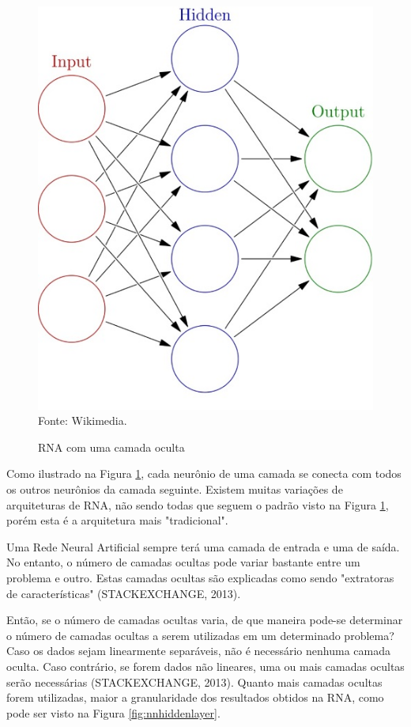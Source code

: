 \documentclass[12pt,a4paper]{article}
\newcommand{\source}[1]{\small Fonte: {#1}}
\begin{document}
	\begin{figure}[ht!]
		\caption{RNA com uma camada oculta}
		\centering
		\includegraphics[scale=0.5]{BasicNN.jpg}\\
		\vspace{0.5mm}
		\source{Wikimedia.}
		\label{fig:basicnn}
	\end{figure}
	
	Como ilustrado na Figura \ref{fig:basicnn},
	cada neurônio de uma camada se conecta com todos os outros neurônios da camada seguinte.
	Existem muitas variações de arquiteturas de RNA,
	não sendo todas que seguem o padrão visto na Figura \ref{fig:basicnn},
	porém esta é a arquitetura mais "tradicional"{}.
	
	Uma Rede Neural Artificial sempre terá uma camada de entrada e uma de saída.
	No entanto, o número de camadas ocultas pode variar bastante entre um problema e outro.
	Estas camadas ocultas são explicadas como sendo "extratoras de características"{}
	(STACKEXCHANGE, 2013).
	
	Então, se o número de camadas ocultas varia,
	de que maneira pode-se determinar o número de camadas ocultas a serem utilizadas em um determinado problema?
	Caso os dados sejam linearmente separáveis,
	não é necessário nenhuma camada oculta.
	Caso contrário, se forem dados não lineares,
	uma ou mais camadas ocultas serão necessárias
	(STACKEXCHANGE, 2013).
	Quanto mais camadas ocultas forem utilizadas,
	maior a granularidade dos resultados obtidos na RNA,
	como pode ser visto na Figura \ref{fig:nnhiddenlayer}.
	
\end{document}
